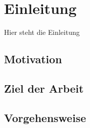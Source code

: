 
\chapter{Einleitung}
\label{sec:introduction}

Hier steht die Einleitung
\section{Motivation}
\label{sec:motivation}
\section{Ziel der Arbeit}
\label{sec:The aim of the work}
\section{Vorgehensweise}
\label{sec:method}